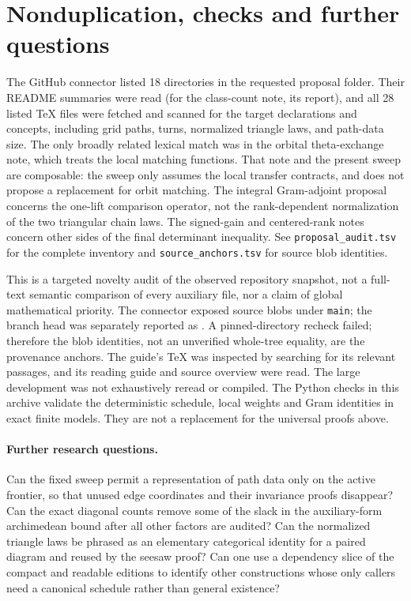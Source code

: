 \documentclass[11pt]{article}
\newcommand{\code}[1]{\texttt{#1}}
\begin{document}
\section{Nonduplication, checks and further questions}
The GitHub connector listed 18 directories in the requested proposal folder. Their README summaries were read (for the class-count note, its report), and all 28 listed TeX files were fetched and scanned for the target declarations and concepts, including grid paths, turns, normalized triangle laws, and path-data size. The only broadly related lexical match was in the orbital theta-exchange note, which treats the local matching functions. That note and the present sweep are composable: the sweep only assumes the local transfer contracts, and does not propose a replacement for orbit matching. The integral Gram-adjoint proposal concerns the one-lift comparison operator, not the rank-dependent normalization of the two triangular chain laws. The signed-gain and centered-rank notes concern other sides of the final determinant inequality. See \code{proposal\_audit.tsv} for the complete inventory and \code{source\_anchors.tsv} for source blob identities.

This is a targeted novelty audit of the observed repository snapshot, not a full-text semantic comparison of every auxiliary file, nor a claim of global mathematical priority. The connector exposed source blobs under \code{main}; the branch head was separately reported as
. A pinned-directory recheck failed; therefore the blob identities, not an unverified whole-tree equality, are the provenance anchors. The guide's TeX was inspected by searching for its relevant passages, and its reading guide and source overview were read. The large development was not exhaustively reread or compiled. The Python checks in this archive validate the deterministic schedule, local weights and Gram identities in exact finite models. They are not a replacement for the universal proofs above.

\paragraph{Further research questions.} Can the fixed sweep permit a representation of path data only on the active frontier, so that unused edge coordinates and their invariance proofs disappear? Can the exact diagonal counts remove some of the slack in the auxiliary-form archimedean bound after all other factors are audited? Can the normalized triangle laws be phrased as an elementary categorical identity for a paired diagram and reused by the seesaw proof? Can one use a dependency slice of the compact and readable editions to identify other constructions whose only callers need a canonical schedule rather than general existence?
\end{document}

